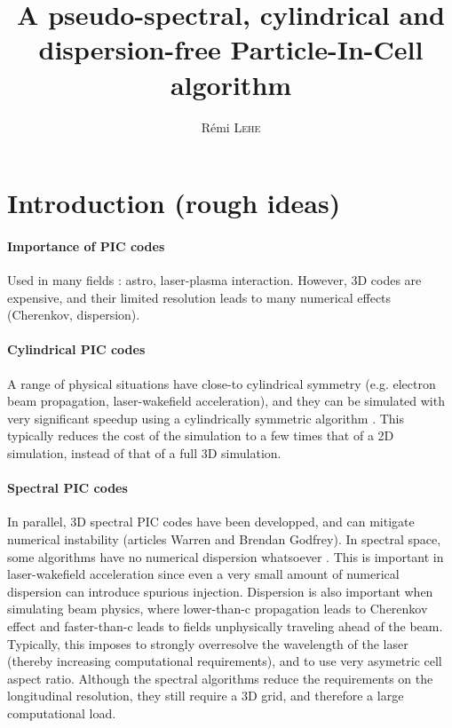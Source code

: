 \documentclass[a4paper]{article}   	%
\title{A pseudo-spectral, cylindrical and dispersion-free Particle-In-Cell algorithm}
\author{R\'emi \textsc{Lehe}}
\begin{document}
\maketitle


\section*{Introduction (rough ideas)}

\paragraph{Importance of PIC codes } Used in many fields : astro, laser-plasma interaction. However, 3D codes are expensive, and their limited resolution leads to many numerical effects (Cherenkov, dispersion).

\paragraph{Cylindrical PIC codes} A range of physical situations have close-to cylindrical symmetry (e.g. electron beam propagation, laser-wakefield acceleration), and they can be simulated with very significant speedup using a cylindrically symmetric algorithm \cite{Lifschitz, Davidson}. This typically reduces the cost of the simulation to a few times that of a 2D simulation, instead of that of a full 3D simulation.

\paragraph{Spectral PIC codes} In parallel, 3D spectral PIC codes have been developped, and can mitigate numerical instability (articles Warren and Brendan Godfrey). In spectral space, some algorithms have no numerical dispersion whatsoever \cite{Haber}. This is important in laser-wakefield acceleration since even a very small amount of numerical dispersion can introduce spurious injection. Dispersion is also important when simulating beam physics, where lower-than-c propagation leads to Cherenkov effect and faster-than-c leads to fields unphysically traveling ahead of the beam. Typically, this imposes to strongly overresolve the wavelength of the laser (thereby increasing computational requirements), and to use very asymetric cell aspect ratio. Although the spectral algorithms reduce the requirements on the longitudinal resolution, they still require a 3D grid, and therefore a large computational load.
\end{document}
